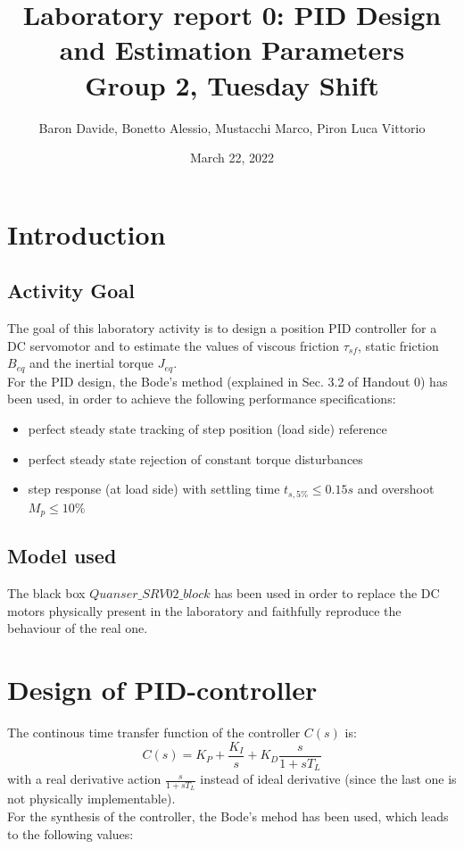 \documentclass[11pt]{article}
\title{
	{\Large Laboratory report 0: PID Design and Estimation Parameters \\
	 \large Group 2, Tuesday Shift}
}
\author{Baron Davide, Bonetto Alessio, Mustacchi Marco, Piron Luca Vittorio}
\date{March 22, 2022}
\begin{document}
\maketitle

\section{Introduction}

	\subsection{Activity Goal}
	The goal of this laboratory activity is to design a position PID controller for a DC servomotor and to estimate the values
	of viscous friction $\tau_{sf}$, static friction $B_{eq}$ and the inertial torque $J_{eq}$. \\
	For the PID design, the Bode's method (explained in Sec. 3.2 of Handout 0) has been used, in order to achieve the following performance specifications:
	
	\begin{itemize}
		\item perfect steady state tracking of step position (load side) reference
		\item perfect steady state rejection of constant torque disturbances
		\item step response (at load side) with settling time $t_{s,5\%} \le 0.15s$ and overshoot $M_{p} \le 10\%$
	\end{itemize}

	\subsection{Model used}
	The black box $\textit{Quanser\_SRV02\_block}$ has been used in order to replace the DC motors physically present in the laboratory
	and faithfully reproduce the behaviour of the real one.

\section{Design of PID-controller}
The continous time transfer function of the controller $C(s)$ is:
	\begin{equation}
		C(s) = K_P +\frac{K_I}{s} + K_D\frac{s}{1 + sT_L}
	\end{equation}
with a real derivative action $\frac{s}{1 + sT_L}$ instead of ideal derivative (since the last one is not physically implementable). \\
For the synthesis of the controller, the Bode's mehod has been used, which leads to the following values:
\end{document}
